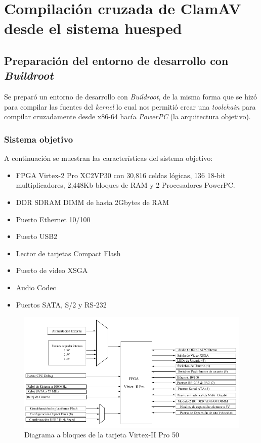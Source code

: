 \section{Compilación cruzada de ClamAV desde el sistema huesped}

\subsection{Preparación del entorno de desarrollo con \emph{Buildroot}}

Se preparó un entorno de desarrollo con \emph{Buildroot}, de la misma forma 
que se  hizó para compilar las fuentes del \emph{kernel} lo cual nos permitió 
crear una \emph{toolchain} para compilar cruzadamente desde x86-64 hacía 
\emph{PowerPC} (la arquitectura objetivo).

\subsubsection{Sistema objetivo}

A continuación se muestran las  características del sistema objetivo:

  \begin{itemize}
  \item FPGA Virtex-2 Pro XC2VP30  con 30,816 celdas lógicas, 136 18-bit
multiplicadores,
  2,448Kb bloques de RAM y 2 Procesadores PowerPC.
  \item DDR SDRAM DIMM de hasta  2Gbytes de RAM
  \item Puerto Ethernet 10/100
  \item Puerto USB2 
  \item Lector de tarjetas Compact Flash
  \item Puerto de video XSGA
  \item Audio Codec
  \item Puertos SATA, S/2 y RS-232
  \end{itemize}
   
\begin{figure}[ht]
 \centering
 \includegraphics[scale=.50]{./figuras/virtex.png}
 \caption{Diagrama a bloques de la tarjeta Virtex-II Pro 50}
 \label{Diagrama a bloques de la tarjeta Virtex-II Pro 50}
\end{figure}

